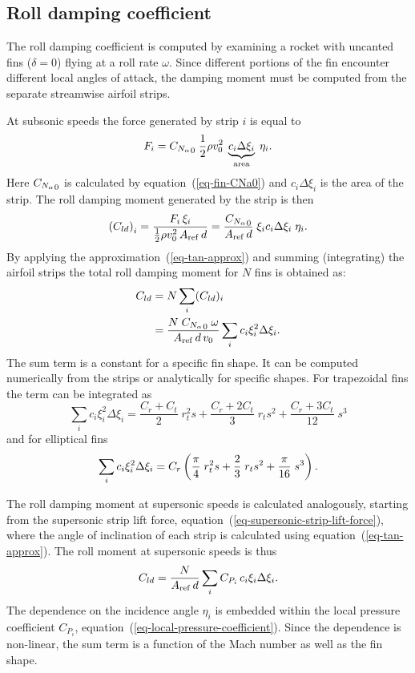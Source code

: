 \subsection{Roll damping coefficient}

The roll damping coefficient is computed by examining a rocket with
uncanted fins ($\delta=0$) flying at a roll rate $\omega$.  Since
different portions of the fin encounter different local angles of
attack, the damping moment must be computed from the separate
streamwise airfoil strips.

At subsonic speeds the force generated by strip $i$ is equal to
%
\begin{equation}
F_i = {C_{N_\alpha}}_0 \; \frac{1}{2}\rho v_0^2 \; 
\underbrace{c_i \Delta\xi_i}_{\rm area} \; \eta_i.
\end{equation}
%
Here ${C_{N_\alpha}}_0$ is calculated by equation~(\ref{eq-fin-CNa0}) and 
$c_i \Delta\xi_i$ is the area of the strip.  The roll damping moment
generated by the strip is then
%
\begin{equation}
\del{C_{ld}}_i
  = \frac{F_i\,\xi_i}{\frac{1}{2}\rho v_0^2\,\Aref\, d}
  = \frac{\CNa_0}{\Aref\,d} \; \xi_i c_i\Delta\xi_i \; \eta_i.
\end{equation}
%
By applying the approximation~(\ref{eq-tan-approx}) and summing
(integrating) the airfoil strips the total roll damping moment for $N$
fins is obtained as:
%
\begin{align}
C_{ld} & = N \sum_i (C_{ld})_i \nonumber \\
& = \frac{N \;{C_{N_\alpha}}_0\;\omega}{A_{\rm ref}\,d\,v_0} \sum_i c_i\xi_i^2\Delta\xi_i.
\label{eq-roll-damping-moment}
\end{align}
%
The sum term is a constant for a specific fin shape.  It can be
computed numerically from the strips or analytically for specific
shapes.  For trapezoidal fins the term can be integrated as
%
\begin{equation}
\sum_i c_i\xi_i^2\Delta\xi_i = 
\frac{C_r+C_t}{2}\;r_t^2s + \frac{C_r+2C_t}{3}\;r_ts^2 + 
\frac{C_r+3C_t}{12}\;s^3
\end{equation}
%
and for elliptical fins
%
\begin{equation}
\sum_i c_i\xi_i^2\Delta\xi_i = 
C_r \del{ \frac{\pi}{4}\;r_t^2s + \frac{2}{3}\;r_ts^2 +
  \frac{\pi}{16}\;s^3 }.
\end{equation}


The roll damping moment at supersonic speeds is calculated
analogously, starting from the supersonic strip lift force,
equation~(\ref{eq-supersonic-strip-lift-force}), where the angle of
inclination of each strip is calculated using
equation~(\ref{eq-tan-approx}).  The roll moment at supersonic speeds
is thus
%
\begin{equation}
C_{ld} = \frac{N}{A_{\rm ref}\,d} \sum_i C_{P_i}\, c_i \xi_i \Delta \xi_i.
\end{equation}
%
The dependence on the incidence angle $\eta_i$ is embedded within the
local pressure coefficient $C_{P_i}$,
equation~(\ref{eq-local-pressure-coefficient}).  Since the dependence
is non-linear, the sum term is a function of the Mach number as well
as the fin shape.




